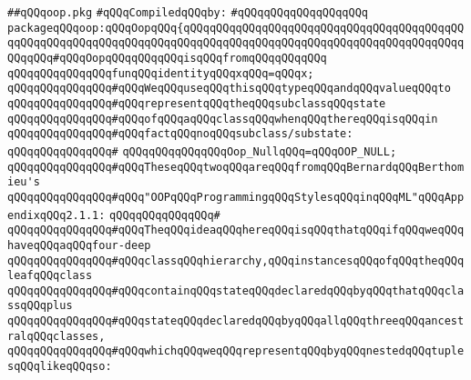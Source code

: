 \label{src/lib/src/oop.pkg}
\verb|##qQQqoop.pkg|\newline
\newline
\verb|#qQQqCompiledqQQqby:|\newline
\verb|#qQQqqQQqqQQqqQQqqQQq|\newline
\newline
\verb|packageqQQqoop:qQQqOopqQQq{qQQqqQQqqQQqqQQqqQQqqQQqqQQqqQQqqQQqqQQqqQQqqQQqqQQqqQQqqQQqqQQqqQQqqQQqqQQqqQQqqQQqqQQqqQQqqQQqqQQqqQQqqQQqqQQqqQQqqQQq#qQQqOopqQQqqQQqqQQqisqQQqfromqQQqqQQqqQQq|\newline
\newline
\verb|qQQqqQQqqQQqqQQqfunqQQqidentityqQQqxqQQq=qQQqx;|\newline
\newline
\verb|qQQqqQQqqQQqqQQq#qQQqWeqQQquseqQQqthisqQQqtypeqQQqandqQQqvalueqQQqto|\newline
\verb|qQQqqQQqqQQqqQQq#qQQqrepresentqQQqtheqQQqsubclassqQQqstate|\newline
\verb|qQQqqQQqqQQqqQQq#qQQqofqQQqaqQQqclassqQQqwhenqQQqthereqQQqisqQQqin|\newline
\verb|qQQqqQQqqQQqqQQq#qQQqfactqQQqnoqQQqsubclass/substate:|\newline
\verb|qQQqqQQqqQQqqQQq#|\newline
\verb|qQQqqQQqqQQqqQQqOop_NullqQQq=qQQqOOP_NULL;|\newline
\newline
\verb|qQQqqQQqqQQqqQQq#qQQqTheseqQQqtwoqQQqareqQQqfromqQQqBernardqQQqBerthomieu's|\newline
\verb|qQQqqQQqqQQqqQQq#qQQq"OOPqQQqProgrammingqQQqStylesqQQqinqQQqML"qQQqAppendixqQQq2.1.1:|\newline
\verb|qQQqqQQqqQQqqQQq#|\newline
\verb|qQQqqQQqqQQqqQQq#qQQqTheqQQqideaqQQqhereqQQqisqQQqthatqQQqifqQQqweqQQqhaveqQQqaqQQqfour-deep|\newline
\verb|qQQqqQQqqQQqqQQq#qQQqclassqQQqhierarchy,qQQqinstancesqQQqofqQQqtheqQQqleafqQQqclass|\newline
\verb|qQQqqQQqqQQqqQQq#qQQqcontainqQQqstateqQQqdeclaredqQQqbyqQQqthatqQQqclassqQQqplus|\newline
\verb|qQQqqQQqqQQqqQQq#qQQqstateqQQqdeclaredqQQqbyqQQqallqQQqthreeqQQqancestralqQQqclasses,|\newline
\verb|qQQqqQQqqQQqqQQq#qQQqwhichqQQqweqQQqrepresentqQQqbyqQQqnestedqQQqtuplesqQQqlikeqQQqso:|\newline
